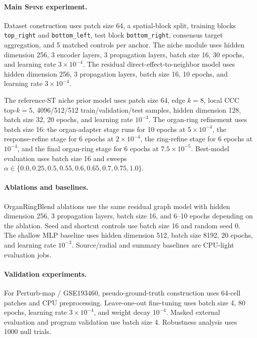 \documentclass[sigconf,anonymous,review]{acmart}
\newcommand{\methodname}{\textsc{Spine}\xspace}
\begin{document}
\paragraph{Main \methodname{} experiment.}
Dataset construction uses patch size 64, a spatial-block split, training blocks \texttt{top\_right} and \texttt{bottom\_left}, test block \texttt{bottom\_right}, consensus target aggregation, and 5 matched controls per anchor. The niche module uses hidden dimension 256, 3 encoder layers, 3 propagation layers, batch size 16, 30 epochs, and learning rate $3\times10^{-4}$. The residual direct-effect-to-neighbor model uses hidden dimension 256, 3 propagation layers, batch size 16, 10 epochs, and learning rate $3\times10^{-4}$.

The reference-ST niche prior model uses patch size 64, edge $k=8$, local CCC top-$k=5$, 4096/512/512 train/validation/test samples, hidden dimension 128, batch size 32, 20 epochs, and learning rate $10^{-3}$. The organ-ring refinement uses batch size 16: the organ-adapter stage runs for 10 epochs at $5\times10^{-4}$, the response-refine stage for 6 epochs at $2\times10^{-4}$, the ring-refine stage for 6 epochs at $10^{-4}$, and the final organ-ring stage for 6 epochs at $7.5\times10^{-5}$. Best-model evaluation uses batch size 16 and sweeps $\alpha\in\{0.0,0.25,0.5,0.55,0.6,0.65,0.7,0.75,1.0\}$.

\paragraph{Ablations and baselines.}
OrganRingBlend ablations use the same residual graph model with hidden dimension 256, 3 propagation layers, batch size 16, and 6--10 epochs depending on the ablation. Seed and shortcut controls use batch size 16 and random seed 0. The shallow MLP baseline uses hidden dimension 512, batch size 8192, 20 epochs, and learning rate $10^{-3}$. Source/radial and summary baselines are CPU-light evaluation jobs.

\paragraph{Validation experiments.}
For Perturb-map / GSE193460, pseudo-ground-truth construction uses 64-cell patches and CPU preprocessing. Leave-one-out fine-tuning uses batch size 4, 80 epochs, learning rate $3\times10^{-4}$, and weight decay $10^{-4}$. Masked external evaluation and program validation use batch size 4. Robustness analysis uses 1000 null trials.
\end{document}

